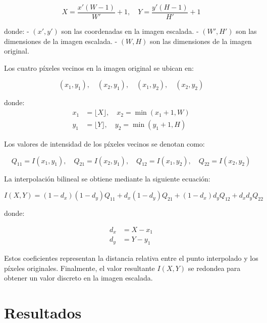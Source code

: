 \documentclass[11pt, letterpaper]{article}
\begin{document}
	\begin{equation}
		X = \frac{x' (W - 1)}{W'} + 1, \quad Y = \frac{y' (H - 1)}{H'} + 1
	\end{equation}
	
	donde:
	- $(x', y')$ son las coordenadas en la imagen escalada.
	- $(W', H')$ son las dimensiones de la imagen escalada.
	- $(W, H)$ son las dimensiones de la imagen original.
	
	Los cuatro píxeles vecinos en la imagen original se ubican en:
	
	\begin{equation}
		(x_1, y_1), \quad (x_2, y_1), \quad (x_1, y_2), \quad (x_2, y_2)
	\end{equation}
	
	donde:
	\begin{align*}
		x_1 &= \lfloor X \rfloor, \quad x_2 = \min(x_1 + 1, W) \\
		y_1 &= \lfloor Y \rfloor, \quad y_2 = \min(y_1 + 1, H)
	\end{align*}
	
	Los valores de intensidad de los píxeles vecinos se denotan como:
	
	\begin{equation}
		Q_{11} = I(x_1, y_1), \quad Q_{21} = I(x_2, y_1), \quad Q_{12} = I(x_1, y_2), \quad Q_{22} = I(x_2, y_2)
	\end{equation}
	
	La interpolación bilineal se obtiene mediante la siguiente ecuación:
	
	\begin{equation}
		I(X, Y) = (1 - d_x)(1 - d_y) Q_{11} + d_x (1 - d_y) Q_{21} + (1 - d_x) d_y Q_{12} + d_x d_y Q_{22}
	\end{equation}
	
	donde:
	
	\begin{align*}
		d_x &= X - x_1 \\
		d_y &= Y - y_1
	\end{align*}
	
	Estos coeficientes representan la distancia relativa entre el punto interpolado y los píxeles originales. Finalmente, el valor resultante $I(X, Y)$ se redondea para obtener un valor discreto en la imagen escalada.
	
	\newpage
	
	\section{Resultados}
	
\end{document}
